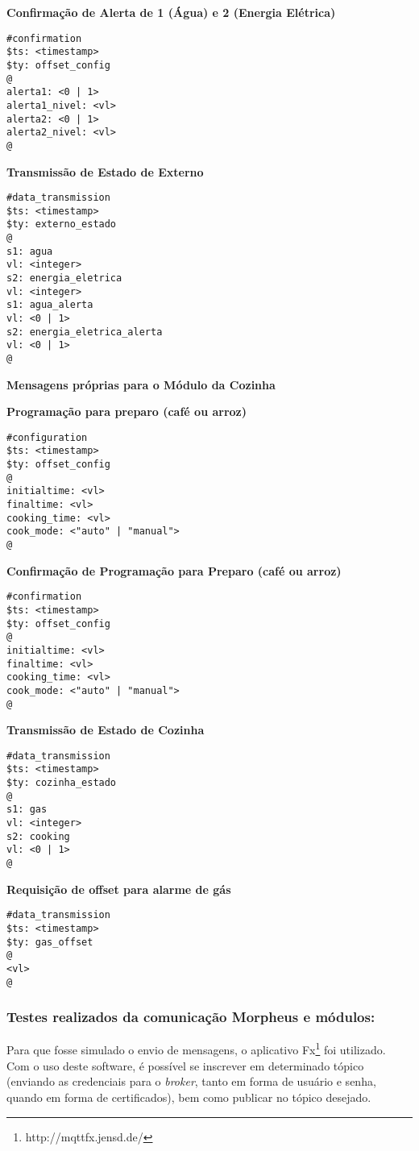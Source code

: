 \textbf{Confirmação de Alerta de 1 (Água) e 2 (Energia Elétrica)}
\begin{lstlisting}
#confirmation
$ts: <timestamp>
$ty: offset_config
@
alerta1: <0 | 1>
alerta1_nivel: <vl>
alerta2: <0 | 1>
alerta2_nivel: <vl>
@
\end{lstlisting}

\textbf{Transmissão de Estado de Externo}
\begin{lstlisting}
#data_transmission
$ts: <timestamp>
$ty: externo_estado
@
s1: agua
vl: <integer>
s2: energia_eletrica
vl: <integer>
s1: agua_alerta
vl: <0 | 1>
s2: energia_eletrica_alerta
vl: <0 | 1>
@
\end{lstlisting}

\textbf{Mensagens próprias para o Módulo da Cozinha}

\textbf{Programação para preparo (café ou arroz)}
\begin{lstlisting}
#configuration
$ts: <timestamp>
$ty: offset_config
@
initialtime: <vl>
finaltime: <vl>
cooking_time: <vl>
cook_mode: <"auto" | "manual">
@
\end{lstlisting}

\textbf{Confirmação de Programação para Preparo (café ou arroz)}
\begin{lstlisting}
#confirmation
$ts: <timestamp>
$ty: offset_config
@
initialtime: <vl>
finaltime: <vl>
cooking_time: <vl>
cook_mode: <"auto" | "manual">
@
\end{lstlisting}

\textbf{Transmissão de Estado de Cozinha}
\begin{lstlisting}
#data_transmission
$ts: <timestamp>
$ty: cozinha_estado
@
s1: gas
vl: <integer>
s2: cooking
vl: <0 | 1>
@
\end{lstlisting}

\textbf{Requisição de offset para alarme de gás}
\begin{lstlisting}
#data_transmission
$ts: <timestamp>
$ty: gas_offset
@
<vl>
@
\end{lstlisting}

\subsubsection{Testes realizados da comunicação Morpheus e módulos:}

Para que fosse simulado o envio de mensagens, o aplicativo \wmqtt{} Fx\footnote{http://mqttfx.jensd.de/} foi utilizado. Com o uso deste software, é possível se inscrever em determinado tópico (enviando as credenciais para o \emph{broker}, tanto em forma de usuário e senha, quando em forma de certificados), bem como publicar no tópico desejado.

